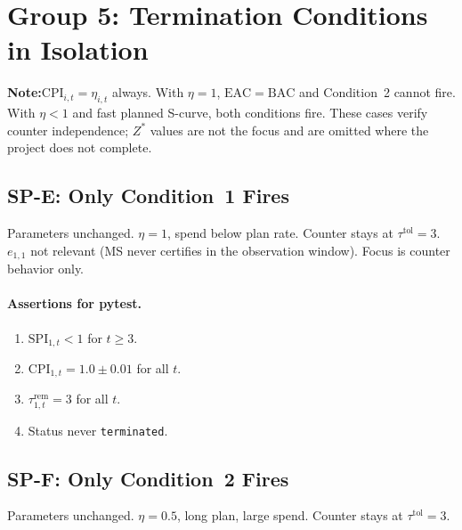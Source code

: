 \documentclass[11pt, a4paper]{article}
\newcommand{\NOTEH}{\textcolor{noteblu}{\bfseries Note:}\quad}
\newcommand{\BAC}{\mathrm{BAC}}
\newcommand{\EAC}{\mathrm{EAC}}
\newcommand{\SPI}{\mathrm{SPI}}
\newcommand{\CPI}{\mathrm{CPI}}
\begin{document}
\section{Group 5: Termination Conditions in Isolation}

\begin{notebox}
\NOTEH $\CPI_{i,t}=\eta_{i,t}$ always. With $\eta=1$, $\EAC=\BAC$
and Condition~2 cannot fire. With $\eta<1$ and fast planned S-curve,
both conditions fire. These cases verify counter independence; $Z^*$
values are not the focus and are omitted where the project does not
complete.
\end{notebox}

\subsection{SP-E: Only Condition~1 Fires}

Parameters unchanged. $\eta=1$, spend below plan rate. Counter stays
at $\tau^{\mathrm{tol}}=3$. $e_{1,1}$ not relevant (MS never certifies
in the observation window). Focus is counter behavior only.

\paragraph{Assertions for pytest.}
\begin{enumerate}[label=A\arabic*.]
  \item $\SPI_{1,t}<1$ for $t\geq3$.
  \item $\CPI_{1,t}=1.0\pm0.01$ for all $t$.
  \item $\tau_{1,t}^{\mathrm{rem}}=3$ for all $t$.
  \item Status never \texttt{terminated}.
\end{enumerate}

\subsection{SP-F: Only Condition~2 Fires}

Parameters unchanged. $\eta=0.5$, long plan, large spend. Counter stays
at $\tau^{\mathrm{tol}}=3$.
\end{document}
